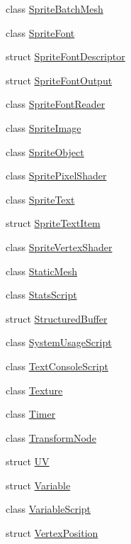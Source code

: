 \begin{DoxyCompactItemize}
\item 
class \hyperlink{classmage_1_1_sprite_batch_mesh}{Sprite\+Batch\+Mesh}
\item 
class \hyperlink{classmage_1_1_sprite_font}{Sprite\+Font}
\item 
struct \hyperlink{structmage_1_1_sprite_font_descriptor}{Sprite\+Font\+Descriptor}
\item 
struct \hyperlink{structmage_1_1_sprite_font_output}{Sprite\+Font\+Output}
\item 
class \hyperlink{classmage_1_1_sprite_font_reader}{Sprite\+Font\+Reader}
\item 
class \hyperlink{classmage_1_1_sprite_image}{Sprite\+Image}
\item 
class \hyperlink{classmage_1_1_sprite_object}{Sprite\+Object}
\item 
class \hyperlink{classmage_1_1_sprite_pixel_shader}{Sprite\+Pixel\+Shader}
\item 
class \hyperlink{classmage_1_1_sprite_text}{Sprite\+Text}
\item 
struct \hyperlink{structmage_1_1_sprite_text_item}{Sprite\+Text\+Item}
\item 
class \hyperlink{classmage_1_1_sprite_vertex_shader}{Sprite\+Vertex\+Shader}
\item 
class \hyperlink{classmage_1_1_static_mesh}{Static\+Mesh}
\item 
class \hyperlink{classmage_1_1_stats_script}{Stats\+Script}
\item 
struct \hyperlink{structmage_1_1_structured_buffer}{Structured\+Buffer}
\item 
class \hyperlink{classmage_1_1_system_usage_script}{System\+Usage\+Script}
\item 
class \hyperlink{classmage_1_1_text_console_script}{Text\+Console\+Script}
\item 
class \hyperlink{classmage_1_1_texture}{Texture}
\item 
class \hyperlink{classmage_1_1_timer}{Timer}
\item 
class \hyperlink{classmage_1_1_transform_node}{Transform\+Node}
\item 
struct \hyperlink{structmage_1_1_u_v}{UV}
\item 
struct \hyperlink{structmage_1_1_variable}{Variable}
\item 
class \hyperlink{classmage_1_1_variable_script}{Variable\+Script}
\item 
struct \hyperlink{structmage_1_1_vertex_position}{Vertex\+Position}
\item 

\end{DoxyCompactItemize}
